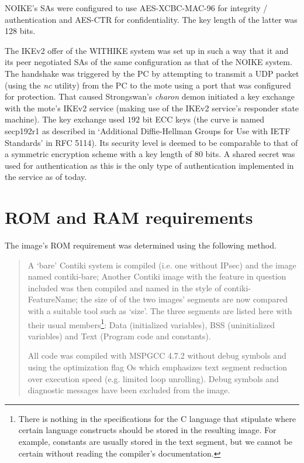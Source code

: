 \documentclass[final,a4paper,twoside,11pt,onecolumn]{report}
\begin{document}
NOIKE's SAs were configured to use AES-XCBC-MAC-96\cite{rfc3566} for integrity / authentication and AES-CTR\cite{rfc3686} for confidentiality. The key length of the latter was 128 bits.

The IKEv2 offer of the WITHIKE system was set up in such a way that it and its peer negotiated SAs of the same configuration as that of the NOIKE system. The handshake was triggered by the PC by attempting to transmit a UDP packet (using the \emph{nc} utility) from the PC to the mote using a port that was configured for protection. That caused Strongswan's \emph{charon} demon initiated a key exchange with the mote's IKEv2 service (making use of the IKEv2 service's responder state machine). The key exchange used $192$ bit ECC keys (the curve is named secp192r1 as described in `Additional Diffie-Hellman Groups for Use with IETF Standards' in RFC 5114\citep[p.5]{rfc5114}). Its security level is deemed to be comparable to that of a symmetric encryption scheme with a key length of 80 bits\citep[p.11]{rfc5114}. A shared secret was used for authentication as this is the only type of authentication implemented in the service as of today.

\section{ROM and RAM requirements}
\label{imagecomp}
The image's ROM requirement was determined using the following method.

\begin{quotation}
A `bare' Contiki system is compiled (i.e. one without IPsec) and the image named contiki-bare; Another Contiki image with the feature in question included was then compiled and named in the style of contiki-FeatureName; the size of of the two images' segments are now compared with a suitable tool such as `size'. The three segments are listed here with their usual members\footnote{There is nothing in the specifications for the C language that stipulate where certain language constructs should be stored in the resulting image. For example, constants are usually stored in the text segment, but we cannot be certain without reading the compiler's documentation.}: Data (initialized variables), BSS (uninitialized variables) and Text (Program code and constants).

All code was compiled with MSPGCC 4.7.2 without debug symbols and using the optimization flag Os which emphasizes text segment reduction over execution speed (e.g. limited loop unrolling). Debug symbols and diagnostic messages have been excluded from the image.
\end{quotation}
\end{document}
